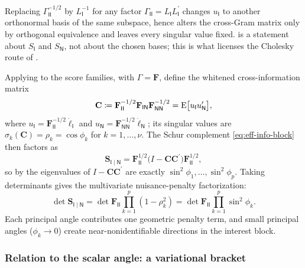 \documentclass{IEEEtran}
\begin{document}
\begin{remark}
  \label{rem:whitening-choice}
  Replacing $\Gamma_{\mathsf{II}}^{-1/2}$ by $L_{\mathsf{I}}^{-1}$ for any factor $\Gamma_{\mathsf{II}}=L_{\mathsf{I}}L_{\mathsf{I}}^{\prime}$ changes $u_{\mathsf{I}}$ to another orthonormal basis of the same subspace, hence alters the cross-Gram matrix only by orthogonal equivalence and leaves every singular value fixed.  is a statement about $S_{\mathsf{I}}$ and $S_{\mathsf{N}}$, not about the chosen bases; this is what licenses the Cholesky route of .
\end{remark}

Applying  to the score families, with $\Gamma = \mathbf{F}$, define the whitened cross-information matrix
\begin{equation}
  \mathbf{C}
  \coloneq
  \mathbf{F}_{\mathsf{II}}^{-1/2}\mathbf{F}_{\mathsf{IN}}\mathbf{F}_{\mathsf{NN}}^{-1/2}
  = \operatorname{E}\bigl[u_{\mathsf{I}}u_{\mathsf{N}}^{\prime}\bigr],
  \label{eq:whitened-cross}
\end{equation}
where $u_{\mathsf{I}} = \mathbf{F}_{\mathsf{II}}^{-1/2}\dot{\ell}_{\mathsf{I}}$ and $u_{\mathsf{N}} = \mathbf{F}_{\mathsf{NN}}^{-1/2}\dot{\ell}_{\mathsf{N}}$; its singular values are $\sigma_{k}(\mathbf{C}) = \rho_{k} = \cos\phi_{k}$ for $k = 1,\ldots,\nu$. The Schur complement \eqref{eq:eff-info-block} then factors as
\begin{equation}
  \mathbf{S}_{\mathsf{I}\mid\mathsf{N}}
  =
  \mathbf{F}_{\mathsf{II}}^{1/2}
  \bigl(I - \mathbf{C}\mathbf{C}^{\prime}\bigr)
  \mathbf{F}_{\mathsf{II}}^{1/2},
  \label{eq:eff-info-factor}
\end{equation}
so by  the eigenvalues of $I - \mathbf{C}\mathbf{C}^{\prime}$ are exactly $\sin^{2}\phi_{1}, \ldots, \sin^{2}\phi_{p}$. Taking determinants gives the multivariate nuisance-penalty factorization:
\begin{equation}
  \det \mathbf{S}_{\mathsf{I}\mid\mathsf{N}}
  =
  \det \mathbf{F}_{\mathsf{II}}
  \prod_{k=1}^{p} (1-\rho_{k}^{2})
  =
  \det \mathbf{F}_{\mathsf{II}}
  \prod_{k=1}^{p} \sin^{2}\phi_{k}.
  \label{eq:block-penalty-product}
\end{equation}
Each principal angle contributes one geometric penalty term, and small principal angles ($\phi_{k} \to 0$) create near-nonidentifiable directions in the interest block.

\subsubsection{Relation to the scalar angle: a variational bracket}
\end{document}
